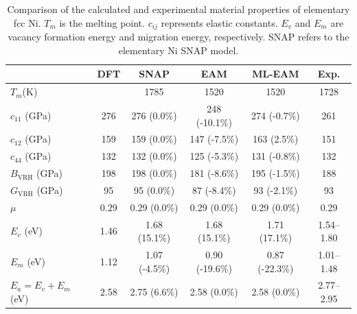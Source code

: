 \documentclass[prb,reprint,superscriptaddress]{revtex4-2}
\begin{document}
% 
%
\begin{table}
\centering
\begin{tabular}{lccccc}
\hline
                              & DFT  & SNAP \cite{SNAP} & EAM              & ML-EAM         & Exp.                           \\
\hline
$T_{m}$(K)                    &      & 1785             & 1520 \cite{ZJW2} & 1520           & 1728                           \\
$c_{11}$ (GPa)                & 276  & 276 (0.0\%)      & 248 (-10.1\%)    & 274 (-0.7\%)   & 261 \cite{Ni_Elastic_Exp}      \\
$c_{12}$ (GPa)                & 159  & 159 (0.0\%)      & 147 (-7.5\%)     & 163 (2.5\%)    & 151 \cite{Ni_Elastic_Exp}      \\
$c_{44}$ (GPa)                & 132  & 132 (0.0\%)      & 125 (-5.3\%)     & 131 (-0.8\%)   & 132 \cite{Ni_Elastic_Exp}      \\
$B_{\mathrm{VRH}}$ (GPa)      & 198  & 198 (0.0\%)      & 181 (-8.6\%)     & 195 (-1.5\%)    & 188                           \\
$G_{\mathrm{VRH}}$ (GPa)      & 95   & 95 (0.0\%)       & 87 (-8.4\%)      & 93 (-2.1\%)    & 93                             \\
$\mu$                         & 0.29 & 0.29 (0.0\%)     & 0.29 (0.0\%)     & 0.29 (0.0\%)   & 0.29                           \\
$E_{v}$ (eV)                  & 1.46 & 1.68 (15.1\%)    & 1.68 (15.1\%)    & 1.71 (17.1\%)  & 1.54–1.80 \cite{Ni_EvEmEa_Exp} \\
$E_{m}$ (eV)                  & 1.12 & 1.07 (-4.5\%)    & 0.90 (-19.6\%)   & 0.87 (-22.3\%) & 1.01–1.48 \cite{Ni_EvEmEa_Exp} \\
$E_{a} = E_{v} + E_{m} $ (eV) & 2.58 & 2.75 (6.6\%)     & 2.58 (0.0\%)     & 2.58 (0.0\%)   & 2.77–2.95 \cite{Ni_EvEmEa_Exp} \\
\hline
\end{tabular}
\caption{\label{table:Ni_properties} Comparison of the calculated and 
experimental material properties of elementary fcc Ni. $T_{m}$ is the melting 
point. $c_{ij}$ represents elastic constants. $E_{v}$ and $E_{m}$ are vacancy 
formation energy and migration energy, respectively. SNAP refers to the 
elementary Ni SNAP model.
}
\end{table}
\end{document}
